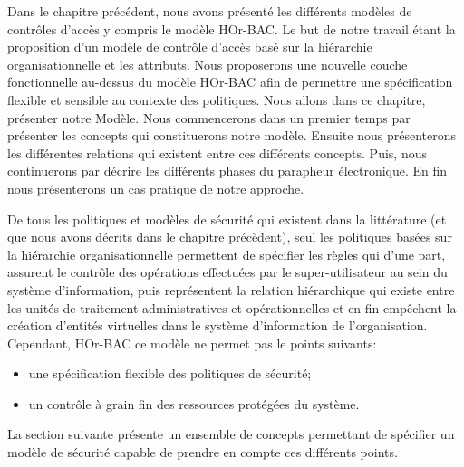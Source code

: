 \label{chapAHOr-BAC}


\label{sectionIntroduction}

Dans le chapitre précédent, nous avons présenté les différents modèles de contrôles d'accès y compris le modèle HOr-BAC. Le but de notre travail étant la proposition d'un modèle de contrôle d'accès basé sur la hiérarchie organisationnelle et les attributs. Nous proposerons une nouvelle couche fonctionnelle au-dessus du modèle HOr-BAC afin de permettre une spécification flexible et sensible au contexte des politiques. Nous allons dans ce chapitre, présenter notre Modèle. Nous commencerons dans un premier temps par présenter les concepts qui constituerons notre modèle. Ensuite nous présenterons les différentes relations qui existent entre ces différents concepts. Puis, nous continuerons par décrire les différents phases du parapheur électronique. En fin nous présenterons un cas pratique de notre approche.

\label{sectionMotivation}

De tous les politiques et modèles de sécurité qui existent dans la littérature (et que nous avons décrits dans le chapitre précèdent), seul les politiques basées sur la hiérarchie organisationnelle permettent de spécifier les règles qui d'une part, assurent le contrôle des opérations effectuées par le super-utilisateur au sein du système d'information, puis représentent la relation hiérarchique qui existe entre les unités de traitement administratives et opérationnelles et en fin empêchent la création d'entités virtuelles dans le système d'information de l'organisation. Cependant, HOr-BAC ce modèle ne permet pas le points suivants:
\begin{itemize}
\item une spécification flexible des politiques de sécurité;
\item un contrôle à grain fin des ressources protégées du système.
\end{itemize} 
\hspace*{0.5cm} La section suivante présente un ensemble de concepts permettant de spécifier un modèle de sécurité capable de prendre en compte ces différents points.

\label{sectionConcept}

